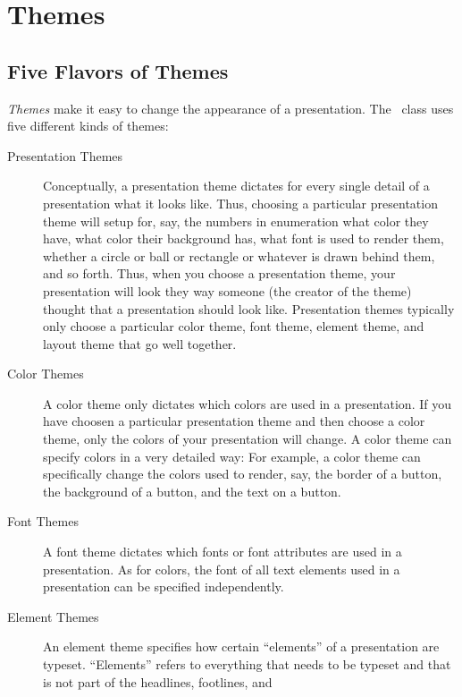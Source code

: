 
%


\section{Themes}


\subsection{Five Flavors of Themes}

\emph{Themes} make it easy to change the appearance of a
presentation. The \beamer\ class uses five different kinds of themes:
\begin{description}
\item[Presentation Themes]
  Conceptually, a presentation theme dictates for every single detail
  of a presentation what it looks like. Thus, choosing a particular
  presentation theme will setup for, say, the numbers in enumeration
  what color they have, what color their background has, what font is
  used to render them, whether a circle or ball or rectangle or
  whatever is drawn behind them, and so forth. Thus, when you choose
  a presentation theme, your presentation will look they way someone
  (the creator of the theme) thought that a presentation should look
  like. Presentation themes typically only choose a particular color
  theme, font theme, element theme, and layout theme that go well
  together. 
\item[Color Themes]
  A color theme only dictates which colors are used in a
  presentation. If you have choosen a particular presentation theme
  and then choose a color theme, only the colors of your presentation
  will change. A color theme can specify colors in a very detailed
  way: For example, a color theme can specifically change the colors
  used to render, say, the border of a button, the background of a
  button, and the text on a button.
\item[Font Themes]
  A font theme dictates which fonts or font attributes are used in a
  presentation. As for colors, the font of all text elements used in a
  presentation can be specified independently.
\item[Element Themes]
  An element theme specifies how certain ``elements'' of a
  presentation are typeset. ``Elements'' refers to everything that needs to
  be typeset and that is not part of the headlines, footlines, and

\end{description}

